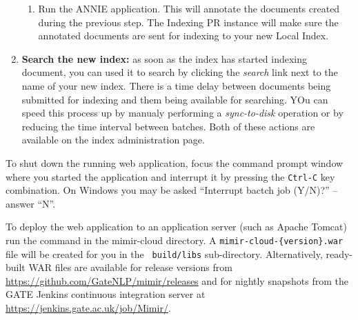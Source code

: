 \begin{enumerate}
\begin{enumerate}
    \item Run the ANNIE application. This will annotate the documents created
    during the previous step. The \Mimir{} Indexing PR instance will make
    sure the annotated documents are sent for indexing to your new Local Index.
  \end{enumerate}
  \item {\bf Search the new index:} as soon as the index has started indexing
  document, you can used it to search by clicking the {\em search} link next to
  the name of your new index. There is a time delay between documents being
  submitted for indexing and them being available for searching. YOu can speed
  this process up by manualy performing a {\em sync-to-disk} operation or by
  reducing the time interval between batches. Both of these actions are
  available on the index administration page.
\end{enumerate}

To shut down the running web application, focus the
command prompt window where you started the application and interrupt it by
pressing the {\tt Ctrl-C} key combination.  On Windows you may be asked
``Interrupt bactch job (Y/N)?'' -- answer ``N''.

To deploy the \Mimir{} web application to an application server (such as Apache
Tomcat) run the  command in the mimir-cloud directory. A
{\tt mimir-cloud-\{version\}.war} file will be created for you in the {\tt
build/libs} sub-directory.  Alternatively, ready-built WAR files are available
for release versions from \url{https://github.com/GateNLP/mimir/releases} and
for nightly snapshots from the GATE Jenkins continuous integration server at
\url{https://jenkins.gate.ac.uk/job/Mimir/}.
